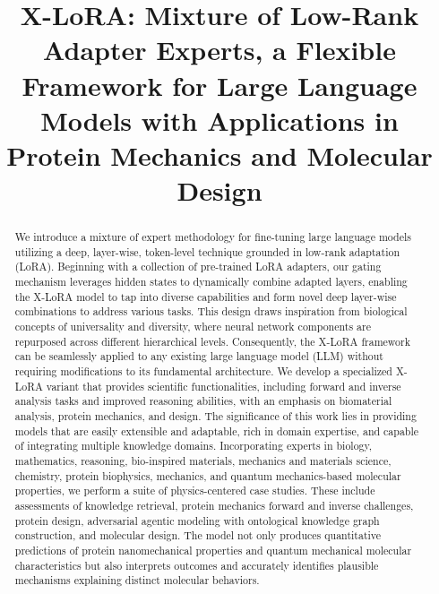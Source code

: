 \title{X-LoRA: Mixture of Low-Rank Adapter Experts, a Flexible Framework for Large Language Models with Applications in Protein Mechanics and Molecular Design}

\begin{abstract}
We introduce a mixture of expert methodology for fine-tuning large language models utilizing a deep, layer-wise, token-level technique grounded in low-rank adaptation (LoRA). Beginning with a collection of pre-trained LoRA adapters, our gating mechanism leverages hidden states to dynamically combine adapted layers, enabling the X-LoRA model to tap into diverse capabilities and form novel deep layer-wise combinations to address various tasks. This design draws inspiration from biological concepts of universality and diversity, where neural network components are repurposed across different hierarchical levels. Consequently, the X-LoRA framework can be seamlessly applied to any existing large language model (LLM) without requiring modifications to its fundamental architecture. We develop a specialized X-LoRA variant that provides scientific functionalities, including forward and inverse analysis tasks and improved reasoning abilities, with an emphasis on biomaterial analysis, protein mechanics, and design. The significance of this work lies in providing models that are easily extensible and adaptable, rich in domain expertise, and capable of integrating multiple knowledge domains. Incorporating experts in biology, mathematics, reasoning, bio-inspired materials, mechanics and materials science, chemistry, protein biophysics, mechanics, and quantum mechanics-based molecular properties, we perform a suite of physics-centered case studies. These include assessments of knowledge retrieval, protein mechanics forward and inverse challenges, protein design, adversarial agentic modeling with ontological knowledge graph construction, and molecular design. The model not only produces quantitative predictions of protein nanomechanical properties and quantum mechanical molecular characteristics but also interprets outcomes and accurately identifies plausible mechanisms explaining distinct molecular behaviors.
\end{abstract}

